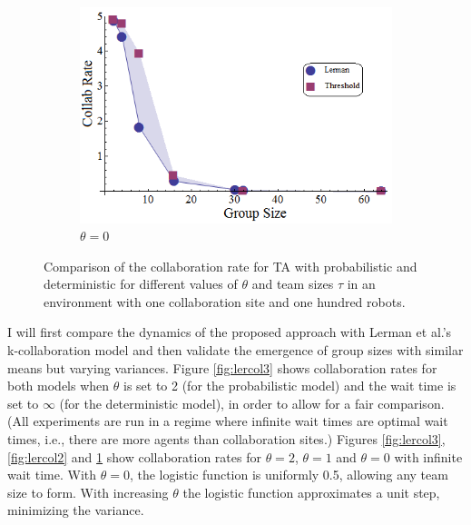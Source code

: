 \documentclass[12pt]{book}
\begin{document}
\begin{figure}[!htb]
\begin{subfigure}{0.33\textwidth}
\centering\includegraphics[width=1.0\textwidth]{../assets/LermanCollabCompare1.png}
\centering\caption{$\theta=0$}\label{fig:lercol1}
\end{subfigure}
\caption{Comparison of the collaboration rate for TA with probabilistic and deterministic \cite{Lerman2001} for different values of $\theta$ and team sizes $\tau$ in an environment with one collaboration site and one hundred robots. }\label{fig:lercol}
\end{figure}

I will first compare the dynamics of the proposed approach with Lerman et al.'s k-collaboration model \cite{Lerman2001} and then validate the emergence of group sizes with similar means but varying variances. Figure \ref{fig:lercol3} shows collaboration rates for both models when $\theta$ is set to 2 (for the probabilistic model) and the wait time is set to $\infty$ (for the deterministic model), in order to allow for a fair comparison. (All experiments are run in a regime where infinite wait times are optimal wait times, i.e., there are more agents than collaboration sites.) Figures \ref{fig:lercol3}, \ref{fig:lercol2} and \ref{fig:lercol1} show collaboration rates for $\theta = 2$, $\theta = 1$ and $\theta=0$ with infinite wait time. With $\theta=0$, the logistic function is uniformly 0.5, allowing any team size to form.  With increasing $\theta$ the logistic function approximates a unit step, minimizing the variance. 
\end{document}
